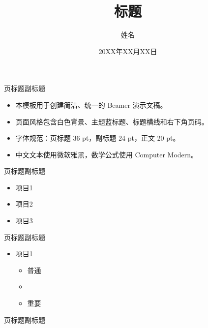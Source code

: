 \documentclass[11pt,notheorems,aspectratio=169,t]{beamer}
\title[标题]{标题}
\author{姓名}
\institute{单位}
\date{20XX年XX月XX日}
\begin{document}
{
\begin{frame}
  \titlepage
\end{frame}
}
\addtocounter{framenumber}{-1}

\begin{frame}{页标题}{副标题}
  \begin{itemize}
    \item 本模板用于创建简洁、统一的 Beamer 演示文稿。
    \item 页面风格包含白色背景、主题蓝标题、标题横线和右下角页码。
    \item 字体规范：页标题 36 pt，副标题 24 pt，正文 20 pt。
    \item 中文文本使用微软雅黑，数学公式使用 Computer Modern。
  \end{itemize}
\end{frame}

\begin{frame}{页标题}{副标题}
  \begin{itemize}
    \item 项目1
    \item 项目2
    \item 项目3
  \end{itemize}
\end{frame}

\begin{frame}{页标题}{副标题}
  \begin{itemize}
    \item 项目1
      \begin{itemize}
        \item 普通
        \item {}
        \item \alert{重要}
      \end{itemize}
  \end{itemize}
\end{frame}

\begin{frame}{页标题}{副标题}
\end{frame}
\end{document}
